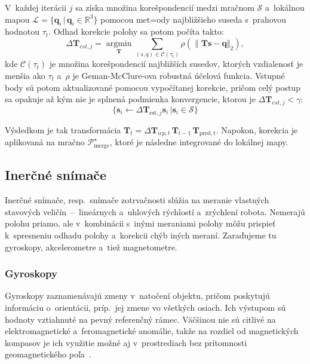       V~každej iterácii $j$ sa získa množina korešpondencií medzi mračnom $\mathcal{S}$ a~lokálnou mapou $\mathcal{L} = \{\bm{q}_i\,|\,\bm{q}_i \in \mathbb{R}^3\}$ pomocou met=ody najbližšieho suseda s~prahovou hodnotou $\tau_t$. Odhad korekcie polohy sa potom počíta takto:
      \begin{equation}
        \Delta \bm{T}_{est,j} = \operatorname*{argmin}_{\bm{T}} \sum_{(s,q) \in \mathcal{C}(\tau_t)} \rho \left( \| \bm{T} \bm{s} - \bm{q} \Vert_2 \right),
      \end{equation}
      kde $\mathcal{C}(\tau_t)$ je množina korešpondencií najbližších susedov, ktorých vzdialenosť je menšia ako $\tau_t$ a~$\rho$ je Geman-McClure-ova robustná účelová funkcia. Vstupné body sú potom aktualizované pomocou vypočítanej korekcie, pričom celý postup sa opakuje až kým nie je splnená podmienka konvergencie, ktorou je $\Delta \bm{T}_{est,j} < \gamma$:
      \begin{equation}
        \{\bm{s}_i \leftarrow \Delta \bm{T}_{\mathrm{est},j} \bm{s}_i\, | \bm{s}_i \in \mathcal{S}\}
      \end{equation}
      
      Výsledkom je tak transformácia $\bm{T}_t = \Delta \bm{T}_{icp,t}\, \bm{T}_{t-1}\, \bm{T}_{\mathrm{pred, t}}$. Napokon, korekcia je aplikovaná na mračno $\mathcal{P}^{\star}_{\mathrm{merge}}$, ktoré je následne integrované do lokálnej mapy.

  \subsection{Inerčné snímače}    
    Inerčné snímače, resp.\ snímače zotrvačnosti slúžia na meranie vlastných stavových veličín~--~lineárnych a~uhlových rýchlostí a~zrýchlení robota. Nemerajú polohu priamo, ale v~kombinácii s~inými meraniami polohy môžu prispieť k~spresneniu odhadu polohy a~korekcii chýb iných meraní. Zaraďujeme tu gyroskopy, akcelerometre a~tiež magnetometre.

    \subsubsection{Gyroskopy}
      Gyroskopy zaznamenávajú zmeny v~natočení objektu, pričom poskytujú informáciu o~orientácii, príp.\ jej zmene vo všetkých osiach. Ich výstupom sú hodnoty vztiahnuté na pevný referenčný rámec. Väčšinou nie sú citlivé na elektromagnetické a~feromagnetické anomálie, takže na rozdiel od magnetických kompasov je ich využitie možné aj v~prostrediach bez prítomnosti geomagnetického poľa~\cite{duchonSnimaceMobilnejRobotike2012}.

